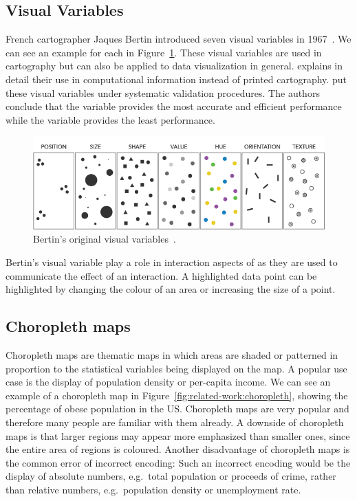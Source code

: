 \subsection{Visual Variables}\label{sec:related-work:visual-variables}
French cartographer Jaques Bertin introduced seven visual variables in 1967~\parencite{Bertin2010}.
We can see an example for each in Figure~\ref{fig:related-work:visual-variables}.
These visual variables are used in cartography but can also be applied to data visualization in general.
\textcite{Carpendale2003} explains in detail their use in computational information instead of printed cartography.
\textcite{Garlandini2009} put these visual variables under systematic validation procedures.
The authors conclude that the variable  provides the most accurate and efficient performance while the variable  provides the least performance.
\begin{figure}[ht]
  \centering
  \includegraphics[width=\textwidth]{figures/related-work/visual-variables}
  \caption{Bertin's original visual variables~\parencite{Foster2017}.}
  \label{fig:related-work:visual-variables}
\end{figure}
Bertin's visual variable play a role in interaction aspects of \cmvs{} as they are used to communicate the effect of an interaction.
A highlighted data point can be highlighted by changing the colour of an area or increasing the size of a point.

\subsection{Choropleth maps}
Choropleth maps are thematic maps in which areas are shaded or patterned in proportion to the statistical variables being displayed on the map.
A popular use case is the display of population density or per-capita income.
We can see an example of a choropleth map in Figure~\ref{fig:related-work:choropleth}, showing the percentage of obese population in the US\@.
Choropleth maps are very popular and therefore many people are familiar with them already.
A downside of choropleth maps is that larger regions may appear more emphasized than smaller ones, since the entire area of regions is coloured.
Another disadvantage of choropleth maps is the common error of incorrect encoding:
Such an incorrect encoding would be the display of absolute numbers, e.g.\ total population or proceeds of crime, rather than relative numbers, e.g.\ population density or unemployment rate.

